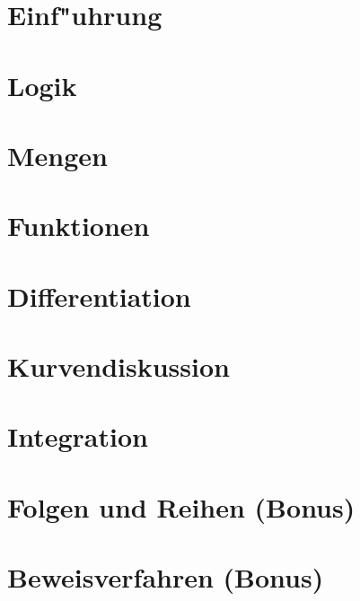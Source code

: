 \documentclass[12pt,a4paper,titlepage]{scrartcl}
\newcommand{\psection}[1]{\pagebreak\section{#1}}
\begin{document}

\clearpage

\psection{Einf"uhrung}


\psection{Logik}


\psection{Mengen}


\psection{Funktionen}


\psection{Differentiation}


\psection{Kurvendiskussion}


\psection{Integration}


\psection{Folgen und Reihen (Bonus)}


\psection{Beweisverfahren (Bonus)}

\end{document}
